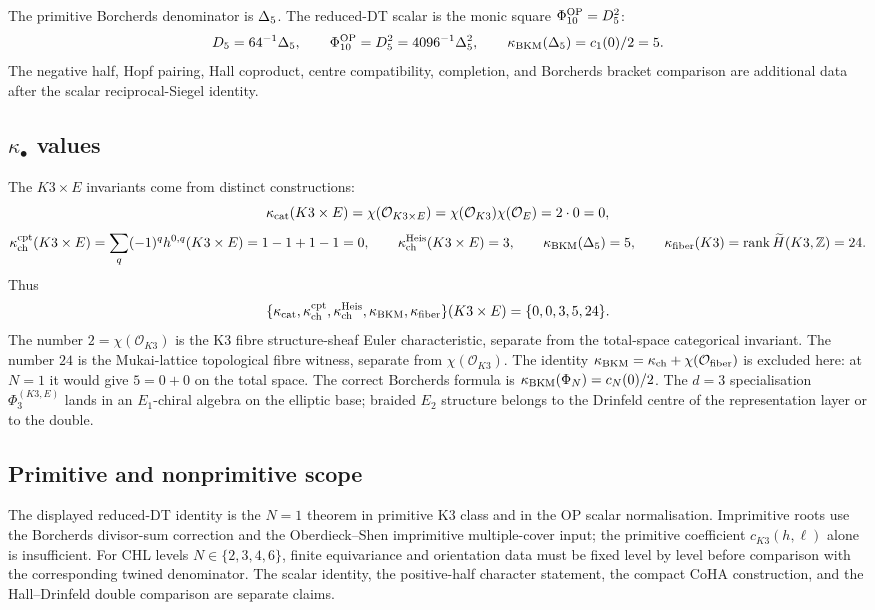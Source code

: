 The primitive Borcherds denominator is \(\Delta_5\).  The reduced-DT
scalar is the monic square \(\Phi_{10}^{\mathrm{OP}}=D_5^2\):
\[
  D_5=64^{-1}\Delta_5,
  \qquad
  \Phi_{10}^{\mathrm{OP}}=D_5^2=4096^{-1}\Delta_5^2,
  \qquad
  \kappa_{\mathrm{BKM}}(\Delta_5)=c_1(0)/2=5.
\]
The negative half, Hopf pairing, Hall coproduct, centre compatibility,
completion, and Borcherds bracket comparison are additional data after
the scalar reciprocal-Siegel identity.

\subsection*{$\kappa_{\bullet}$ values}

The \(K3\times E\) invariants come from distinct constructions:
\[
  \kappa_{\mathrm{cat}}(K3\times E)
  =
  \chi(\mathcal O_{K3\times E})
  =
  \chi(\mathcal O_{K3})\chi(\mathcal O_E)
  =
  2\cdot0
  =
  0,
\]
\[
  \kappa_{\mathrm{ch}}^{\mathrm{cpt}}(K3\times E)
  =
  \sum_q(-1)^q h^{0,q}(K3\times E)
  =
  1-1+1-1
  =
  0,
  \qquad
  \kappa_{\mathrm{ch}}^{\mathrm{Heis}}(K3\times E)=3,
  \qquad
  \kappa_{\mathrm{BKM}}(\Delta_5)=5,
  \qquad
  \kappa_{\mathrm{fiber}}(K3)=\operatorname{rank}\widetilde H(K3,\mathbb Z)=24.
\]
Thus
\[
  \{\kappa_{\mathrm{cat}},\kappa_{\mathrm{ch}}^{\mathrm{cpt}},\kappa_{\mathrm{ch}}^{\mathrm{Heis}},\kappa_{\mathrm{BKM}},\kappa_{\mathrm{fiber}}\}
  (K3\times E)
  =
  \{0,0,3,5,24\}.
\]
The number \(2=\chi(\mathcal O_{K3})\) is the K3 fibre
structure-sheaf Euler characteristic, separate from the total-space
categorical invariant.  The number \(24\) is the Mukai-lattice
topological fibre witness, separate from \(\chi(\mathcal O_{K3})\).
The identity
\(\kappa_{\mathrm{BKM}}=\kappa_{\mathrm{ch}}+\chi(\mathcal O_{\mathrm{fiber}})\) is excluded here:
at \(N=1\) it would give \(5=0+0\) on the total space.  The correct
Borcherds formula is \(\kappa_{\mathrm{BKM}}(\Phi_N)=c_N(0)/2\).  The \(d=3\)
specialisation
\(\Phi_3^{(K3,E)}\) lands in an \(E_1\)-chiral algebra on the elliptic
base; braided \(E_2\) structure belongs to the Drinfeld centre of the
representation layer or to the double.

\subsection*{Primitive and nonprimitive scope}

The displayed reduced-DT identity is the \(N=1\) theorem in primitive
K3 class and in the OP scalar normalisation.  Imprimitive roots use the
Borcherds divisor-sum correction and the Oberdieck--Shen imprimitive
multiple-cover input; the primitive coefficient \(c_{K3}(h,\ell)\)
alone is insufficient.  For CHL levels \(N\in\{2,3,4,6\}\), finite
equivariance and orientation data must be fixed level by level before
comparison with the corresponding twined denominator.  The scalar
identity, the positive-half character statement, the compact CoHA
construction, and the Hall--Drinfeld double comparison are separate
claims.

